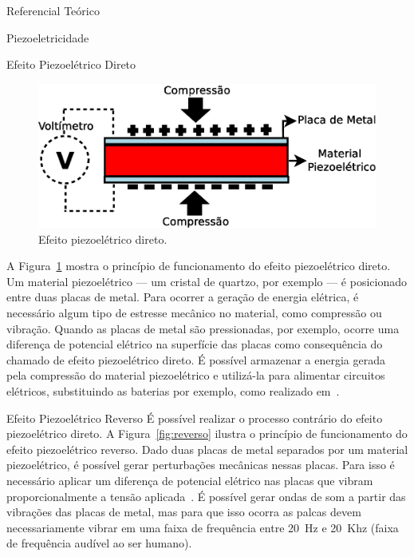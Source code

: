 \begin{chapter}{Referencial Teórico}
\begin{section}{Piezoeletricidade}
\begin{subsection}{Efeito Piezoelétrico Direto}
\begin{figure}[!h]
	\centering
	\begin{minipage}[c]{\textwidth}
	\centering
	\includegraphics[width=0.9\linewidth]{fig/EfeitoPiezoEletricoDireto}
	\caption{Efeito piezoelétrico direto.}
	\label{fig:direto}
	\end{minipage}
\end{figure}

A Figura~\ref{fig:direto} mostra o princípio de funcionamento do efeito
piezoelétrico direto. Um material piezoelétrico --- um cristal de quartzo, por
exemplo --- é posicionado entre duas placas de metal. Para ocorrer a geração de
energia elétrica, é necessário algum tipo de estresse mecânico no material, como
compressão ou vibração. Quando as placas de metal são pressionadas, por exemplo,
ocorre uma diferença de potencial elétrico na superfície das placas como
consequência do chamado de efeito piezoelétrico direto.  É possível armazenar a
energia gerada pela compressão do material piezoelétrico e utilizá-la para
alimentar circuitos elétricos, substituindo as baterias por exemplo, como
realizado em~\cite{twitter}. 

\end{subsection}


\begin{subsection}{Efeito Piezoelétrico Reverso}
É possível realizar o processo contrário do efeito piezoelétrico direto. A
Figura~\ref{fig:reverso} ilustra o princípio de funcionamento do efeito
piezoelétrico reverso. Dado duas placas de metal separados por um material
piezoelétrico, é possível gerar perturbações mecânicas nessas placas. Para isso
é necessário aplicar um diferença de potencial elétrico nas placas que vibram
proporcionalmente a tensão aplicada~\cite{Lin12}. É possível gerar ondas de som a
partir das vibrações das placas de metal, mas para que isso ocorra as palcas
devem necessariamente vibrar em uma faixa de frequência entre 20~Hz e 20~Khz
(faixa de frequência audível ao ser humano).



\end{subsection}
\end{section}
\end{chapter}

